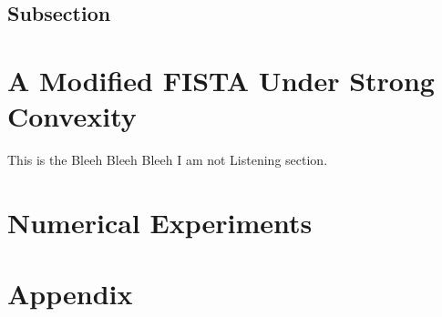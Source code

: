 \documentclass[]{article}
\theoremstyle{definition}
\numberwithin{equation}{subsection}
\begin{document}
    \subsection{Subsection}


    
\section{A Modified FISTA Under Strong Convexity}
    This is the Bleeh Bleeh Bleeh I am not Listening section.         

\section{Numerical Experiments}

\appendix


\section{Appendix} 
    





\end{document}
